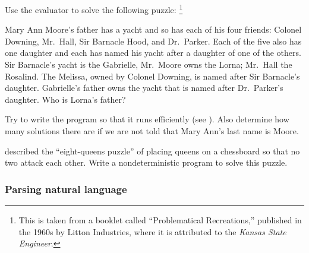 \begin{exercise}
	\label{Exercise 4.43}
	Use the  evaluator to solve the following puzzle:%
	\footnote{
		This is taken from a booklet called “Problematical Recreations,” published in the 1960s by Litton Industries, where it is attributed to the \textit{Kansas State Engineer}.
	}

	Mary Ann Moore’s father has a yacht and so has each of his four friends:
	Colonel Downing, Mr.~Hall, Sir Barnacle Hood, and Dr.~Parker.
	Each of the five also has one daughter and each has named his yacht after a daughter of one of the others.
	Sir Barnacle’s yacht is the Gabrielle, Mr.~Moore owns the Lorna;
	Mr.~Hall the Rosalind.
	The Melissa, owned by Colonel Downing, is named after Sir Barnacle’s daughter.
	Gabrielle’s father owns the yacht that is named after Dr.~Parker’s daughter.
	Who is Lorna’s father?

	Try to write the program so that it runs efficiently (see ).
	Also determine how many solutions there are if we are not told that Mary Ann’s last name is Moore.
\end{exercise}



\begin{exercise}
	\label{Exercise 4.44}
	 described the “eight-queens puzzle” of placing queens on a chessboard so that no two attack each other.
	Write a nondeterministic program to solve this puzzle.
\end{exercise}



\subsubsection*{Parsing natural language}

